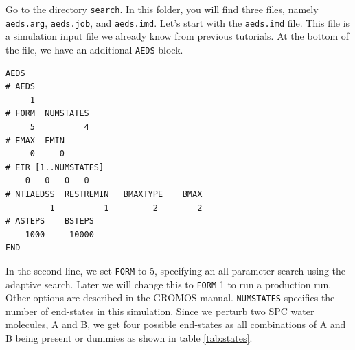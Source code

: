 Go to the directory \texttt{search}. In this folder, you will find three files, namely \texttt{aeds.arg}, \texttt{aeds.job}, and \texttt{aeds.imd}. Let's start with the \texttt{aeds.imd} file. This file is a simulation input file we already know from previous tutorials. At the bottom of the file, we have an additional \texttt{AEDS} block.

\begin{lstlisting}
AEDS
# AEDS
     1
# FORM  NUMSTATES
     5          4
# EMAX  EMIN
     0     0
# EIR [1..NUMSTATES]
    0   0   0   0 
# NTIAEDSS  RESTREMIN   BMAXTYPE    BMAX 
         1          1         2        2    
# ASTEPS    BSTEPS
    1000     10000 
END
\end{lstlisting}
In the second line, we set \texttt{FORM} to 5, specifying an all-parameter search using the adaptive search.
Later we will change this to \texttt{FORM} 1 to run a production run. Other options are described in the GROMOS manual. \texttt{NUMSTATES} specifies the number of end-states in this simulation. Since we perturb two SPC water molecules, A and B, we get four possible end-states as all combinations of A and B being present or dummies as shown in table \ref{tab:states}.


